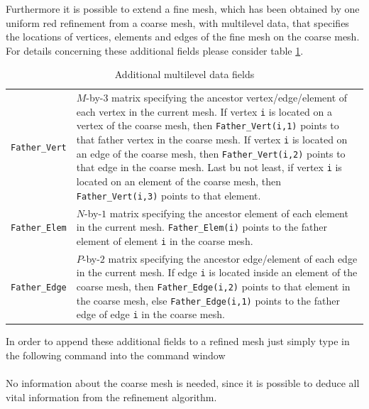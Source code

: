 Furthermore it is possible to extend a fine mesh, which has been obtained by one uniform red refinement from a coarse mesh,
with multilevel data, that specifies the locations of vertices, elements and edges of the fine mesh on the coarse mesh. For
details concerning these additional fields please consider table \ref{tab:MLEVEL}.

\begin{table}[htb]
  \begin{tabular}{p{2cm}p{9cm}}
    {\tt Father\_Vert} & \small $M$-by-$3$ matrix specifying the ancestor vertex/edge/element of each vertex
                         in the current mesh. If vertex {\tt i} is located on a vertex of the coarse mesh,
                         then {\tt Father\_Vert(i,1)} points to that father vertex in the coarse mesh.
                         If vertex {\tt i} is located on an edge of the coarse mesh, then {\tt Father\_Vert(i,2)}
                         points to that edge in the coarse mesh. Last bu not least, if vertex {\tt i} is located
                         on an element of the coarse mesh, then {\tt Father\_Vert(i,3)} points to that element.     \\
    {\tt Father\_Elem} & \small $N$-by-$1$ matrix specifying the ancestor element of each element in the current
                         mesh. {\tt Father\_Elem(i)} points to the father element of element {\tt i} in the coarse
                         mesh.                                                                                         \\
    {\tt Father\_Edge} & \small $P$-by-$2$ matrix specifying the ancestor edge/element of each edge in the
                         current mesh. If edge {\tt i} is located inside an element of the coarse mesh, then
                         {\tt Father\_Edge(i,2)} points to that element in the coarse mesh, else
                         {\tt Father\_Edge(i,1)} points to the father edge of edge {\tt i} in the coarse mesh.
  \end{tabular}
  \caption{Additional multilevel data fields}
  \label{tab:MLEVEL}
\end{table}

{\noindent} In order to append these additional fields to a refined mesh just simply type in the following command into
the \MATLAB command window \\

 \\

\noindent No information about the coarse mesh is needed, since it is possible to deduce all vital information from the
refinement algorithm.


